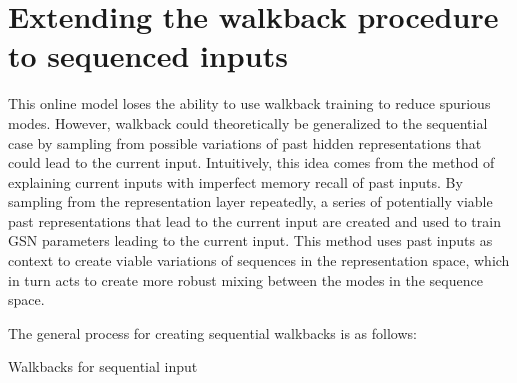 \section{Extending the walkback procedure to sequenced inputs}

This online model loses the ability to use walkback training to reduce spurious modes. However, walkback could theoretically be generalized to the sequential case by sampling from possible variations of past hidden representations that could lead to the current input. Intuitively, this idea comes from the method of explaining current inputs with imperfect memory recall of past inputs. By sampling from the representation layer repeatedly, a series of potentially viable past representations that lead to the current input are created and used to train GSN parameters leading to the current input. This method uses past inputs as context to create viable variations of sequences in the representation space, which in turn acts to create more robust mixing between the modes in the sequence space.

The general process for creating sequential walkbacks is as follows:
\begin{algorithm}[h!]
	\caption{ Walkbacks for sequential input }
\end{algorithm}
